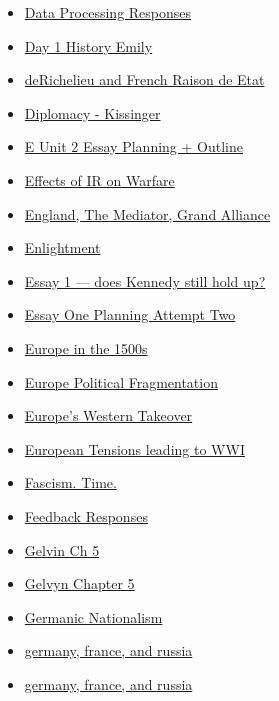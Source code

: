 \documentclass[11pt]{article}
\begin{document}
\begin{itemize}
\begin{itemize}
\begin{itemize}
\item \href{history/history10/KBdataProsResponses.org}{Data Processing Responses}
\item \href{history/history10/KB20200825102230.org}{Day 1 History Emily}
\item \href{history/history10/KBhHIST201FrenchRichelieuAndRaisonDeEtat.org}{deRichelieu and French Raison de Etat}
\item \href{history/history10/KBhHIST201Kissinger.org}{Diplomacy - Kissinger}
\item \href{history/history10/KBe20hist201retUnit2Essay.org}{E Unit 2 Essay Planning + Outline}
\item \href{history/history10/KBhHIST201IRonWarfare.org}{Effects of IR on Warfare}
\item \href{history/history10/KBhHIST201EnglandMediator.org}{England, The Mediator, Grand Alliance}
\item \href{history/history10/KBhHIST201Enlightenment.org}{Enlightment}
\item \href{history/history10/KBhHIST201KennedyStillHoldsUp.org}{Essay 1 --- does Kennedy still hold up?}
\item \href{history/history10/KBEssay1PlanningAttemp2.org}{Essay One Planning Attempt Two}
\item \href{history/history10/KBhHIST201Europe1500s.org}{Europe in the 1500s}
\item \href{history/history10/KBhHIST201PoliticalFragmentationofEurope.org}{Europe Political Fragmentation}
\item \href{history/history10/KBhHIST201EuropesWesternTakeover.org}{Europe's Western Takeover}
\item \href{history/history10/KBhHIST201WWIBeginning.org}{European Tensions leading to WWI}
\item \href{history/history10/KBxFascism.org}{Fascism. Time.}
\item \href{history/history10/KBxFeedbackResponses.org}{Feedback Responses}
\item \href{history/history10/KBe20hist201floGelvinCh5.org}{Gelvin Ch 5}
\item \href{history/history10/KBhHIST201GelvinChapter5.org}{Gelvyn Chapter 5}
\item \href{history/history10/KBhHIST201GermanicNationalism.org}{Germanic Nationalism}
\item \href{history/history10/KBe21hist201retWWICausesPowerStruggle.org}{germany, france, and russia}
\item \href{history/history10/KBe21hist201floWWICauses.org}{germany, france, and russia}

\end{itemize}
\end{itemize}
\end{itemize}
\end{document}
